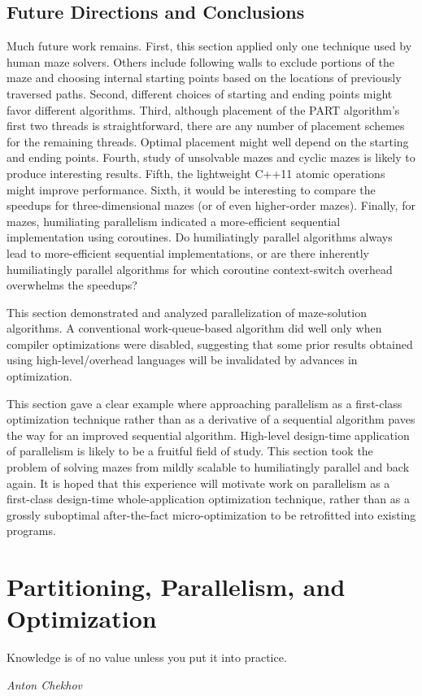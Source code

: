 \subsection{Future Directions and Conclusions}
\label{sec:SMPdesign:Future Directions and Conclusions}

Much future work remains.
First, this section applied only one technique used by human maze solvers.
Others include following walls to exclude portions of the maze
and choosing internal starting points based on the
locations of previously traversed paths.
Second, different choices of
starting and ending points might favor different algorithms.
Third, although placement of the PART algorithm's
first two threads is straightforward, there are any number of
placement schemes for the remaining threads.
Optimal placement might well depend on the starting and ending points.
Fourth, study of unsolvable mazes and cyclic mazes
is likely to produce interesting results.
Fifth, the lightweight C++11 atomic operations might improve performance.
Sixth, it would be interesting to compare the speedups for
three-dimensional mazes (or of even higher-order mazes).
Finally, for mazes, humiliating parallelism indicated a
more-efficient sequential implementation using coroutines.
Do humiliatingly parallel algorithms always lead to more-efficient
sequential implementations, or are there inherently humiliatingly parallel
algorithms for which coroutine context-switch overhead overwhelms the
speedups?

This section demonstrated and analyzed parallelization of maze-solution
algorithms.
A conventional work-queue-based algorithm did well only when compiler
optimizations were disabled, suggesting that some prior results obtained
using high-level/overhead languages will be invalidated
by advances in optimization.

This section gave a clear example where approaching parallelism
as a first-class optimization technique rather than as a derivative of a
sequential algorithm paves the way for an improved sequential algorithm.
High-level design-time application of parallelism is likely to be a
fruitful field of study.
This section took the problem of solving mazes from mildly scalable
to humiliatingly parallel and back again.
It is hoped that this experience will motivate work on parallelism
as a first-class design-time whole-application optimization technique,
rather than as a grossly suboptimal after-the-fact micro-optimization
to be retrofitted into existing programs.

\section{Partitioning, Parallelism, and Optimization}
\label{sec:SMPdesign:Partitioning; Parallelism; and Optimization}
%
\epigraph{Knowledge is of no value unless you put it into practice.}
	 {\emph{Anton Chekhov}}

